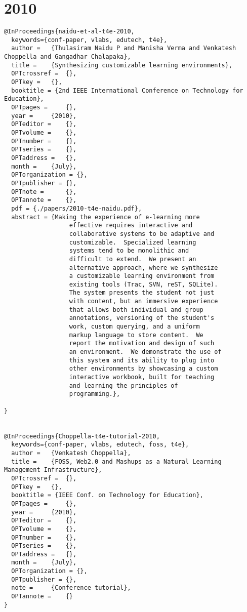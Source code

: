 \documentclass[11pt]{article}
\begin{document}
\section{2010}
\label{sec:org313a60c}
\lstset{language=bibtex,label= ,caption= ,captionpos=b,numbers=none}
\begin{lstlisting}
@InProceedings{naidu-et-al-t4e-2010,
  keywords={conf-paper, vlabs, edutech, t4e},
  author = 	 {Thulasiram Naidu P and Manisha Verma and Venkatesh Choppella and Gangadhar Chalapaka},
  title = 	 {Synthesizing customizable learning environments},
  OPTcrossref =  {},
  OPTkey = 	 {},
  booktitle = {2nd IEEE International Conference on Technology for Education},
  OPTpages = 	 {},
  year = 	 {2010},
  OPTeditor = 	 {},
  OPTvolume = 	 {},
  OPTnumber = 	 {},
  OPTseries = 	 {},
  OPTaddress = 	 {},
  month = 	 {July},
  OPTorganization = {},
  OPTpublisher = {},
  OPTnote = 	 {},
  OPTannote = 	 {},
  pdf = {./papers/2010-t4e-naidu.pdf},
  abstract = {Making the experience of e-learning more
                  effective requires interactive and
                  collaborative systems to be adaptive and
                  customizable.  Specialized learning
                  systems tend to be monolithic and
                  difficult to extend.  We present an
                  alternative approach, where we synthesize
                  a customizable learning environment from
                  existing tools (Trac, SVN, reST, SQLite).
                  The system presents the student not just
                  with content, but an immersive experience
                  that allows both individual and group
                  annotations, versioning of the student's
                  work, custom querying, and a uniform
                  markup language to store content.  We
                  report the motivation and design of such
                  an environment.  We demonstrate the use of
                  this system and its ability to plug into
                  other environments by showcasing a custom
                  interactive workbook, built for teaching
                  and learning the principles of
                  programming.},

}


@InProceedings{Choppella-t4e-tutorial-2010,
  keywords={conf-paper, vlabs, edutech, foss, t4e},
  author = 	 {Venkatesh Choppella},
  title = 	 {FOSS, Web2.0 and Mashups as a Natural Learning Management Infrastructure},
  OPTcrossref =  {},
  OPTkey = 	 {},
  booktitle = {IEEE Conf. on Technology for Education},
  OPTpages = 	 {},
  year = 	 {2010},
  OPTeditor = 	 {},
  OPTvolume = 	 {},
  OPTnumber = 	 {},
  OPTseries = 	 {},
  OPTaddress = 	 {},
  month = 	 {July},
  OPTorganization = {},
  OPTpublisher = {},
  note = 	 {Conference tutorial},
  OPTannote = 	 {}
}
\end{lstlisting}
\end{document}
